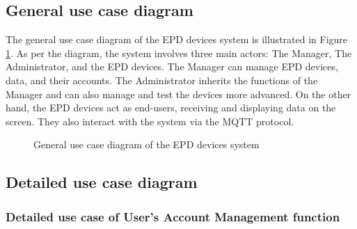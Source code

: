 \documentclass[../Main.tex]{subfiles}
\begin{document}
\subsection{General use case diagram}
\label{subsection:2.2.1}
The general use case diagram of the \gls{EPD} devices system is illustrated in Figure \ref{fig:uc_general}. As per the diagram, the system involves three main actors: The Manager, The Administrator, and the \gls{EPD} devices. The Manager can manage \gls{EPD} devices, data, and their accounts. The Administrator inherits the functions of the Manager and can also manage and test the devices more advanced. On the other hand, the \gls{EPD} devices act as end-users, receiving and displaying data on the screen. They also interact with the system via the MQTT protocol.
\begin{figure}[htbp]
    \centering
    \caption{General use case diagram of the \gls{EPD} devices system}
    \label{fig:uc_general}
\end{figure}

\subsection{Detailed use case diagram}
\label{subsection:2.2.2}

\subsubsection{Detailed use case of User's Account Management function}
\end{document}
